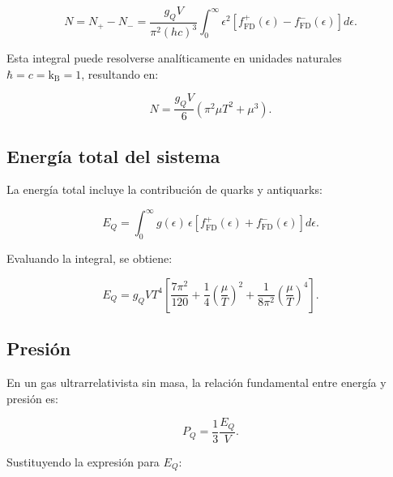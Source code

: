 \begin{equation}\label{eq-FD-Excedente-app}
N = N_+ - N_- = \frac{g_Q V}{\pi^2 (hc)^3} \int_0^\infty \epsilon^2 \left[ f_{\mathrm{FD}}^+(\epsilon) - f_{\mathrm{FD}}^-(\epsilon) \right] d\epsilon.
\end{equation}

Esta integral puede resolverse analíticamente en unidades naturales \( \hbar = c = \text{k}_{\mathrm{B}} = 1 \), resultando en:

\begin{equation}
N = \frac{g_Q V}{6} \left( \pi^2 \mu T^2 + \mu^3 \right).
\end{equation}


\subsection{Energía total del sistema}

La energía total incluye la contribución de quarks y antiquarks:

\begin{equation}
E_Q = \int_0^\infty g(\epsilon) \, \epsilon \left[ f_{\mathrm{FD}}^+(\epsilon) + f_{\mathrm{FD}}^-(\epsilon) \right] d\epsilon.
\end{equation}

Evaluando la integral, se obtiene:

\begin{equation}
E_Q = g_Q V T^4 \left[ \frac{7\pi^2}{120} + \frac{1}{4} \left( \frac{\mu}{T} \right)^2 + \frac{1}{8\pi^2} \left( \frac{\mu}{T} \right)^4 \right].
\end{equation}


\subsection{Presión}

En un gas ultrarrelativista sin masa, la relación fundamental entre energía y presión es:

\begin{equation}
P_Q = \frac{1}{3} \frac{E_Q}{V}.
\end{equation}

Sustituyendo la expresión para \( E_Q \):


